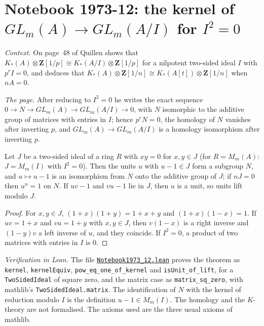 \section[Notebook 1973-12: the kernel of $GL_m(A) \to GL_m(A/I)$ for $I^2 = 0$]{Notebook 1973-12: the kernel of $GL_m(A) \to GL_m(A/I)$ for $I^2 = 0$\protect{}}\label{sec:quillen-1973-12}

\emph{Context.} On page~48 of  Quillen shows that $K_*(A) \otimes \mathbf Z[1/p] \cong K_*(A/I) \otimes \mathbf Z[1/p]$ for a nilpotent two-sided ideal $I$ with $p^rI = 0$, and deduces that $K_*(A) \otimes \mathbf Z[1/n] \cong K_*(A[t]) \otimes \mathbf Z[1/n]$ when $nA = 0$.

\emph{The page.} After reducing to $I^2 = 0$ he writes the exact sequence $0 \to N \to GL_m(A) \to GL_m(A/I) \to 0$, with $N$ isomorphic to the additive group of matrices with entries in $I$; hence $p^rN = 0$, the homology of $N$ vanishes after inverting $p$, and $GL_m(A) \to GL_m(A/I)$ is a homology isomorphism after inverting $p$.

\begin{encadre}
\begin{theoreme}\label{thm:quillen-1973-12}
Let $J$ be a two-sided ideal of a ring $R$ with $xy = 0$ for $x, y \in J$ (for $R = M_m(A)$: $J = M_m(I)$ with $I^2 = 0$). Then the units $u$ with $u - 1 \in J$ form a subgroup $N$, and $u \mapsto u - 1$ is an isomorphism from $N$ onto the additive group of $J$; if $nJ = 0$ then $u^n = 1$ on $N$. If $uv - 1$ and $vu - 1$ lie in $J$, then $u$ is a unit, so units lift modulo $J$.
\end{theoreme}
\end{encadre}

\begin{proof}
For $x, y \in J$, $(1 + x)(1 + y) = 1 + x + y$ and $(1 + x)(1 - x) = 1$. If $uv = 1 + x$ and $vu = 1 + y$ with $x, y \in J$, then $v(1 - x)$ is a right inverse and $(1 - y)v$ a left inverse of $u$, and they coincide. If $I^2 = 0$, a product of two matrices with entries in $I$ is $0$.
\end{proof}

\emph{Verification in Lean.} The file \href{\leanblobmain/Notebook1973_12.lean}{\texttt{Notebook1973\_12.\allowbreak{}lean}} proves the theorem as \texttt{kernel}, \texttt{kernelEquiv}, \texttt{pow\_eq\_one\_of\_kernel} and \texttt{isUnit\_of\_lift}, for a \texttt{TwoSidedIdeal} of square zero, and the matrix case as \texttt{matrix\_sq\_zero}, with mathlib's \texttt{TwoSidedIdeal.matrix}. The identification of $N$ with the kernel of reduction modulo $I$ is the definition $u - 1 \in M_m(I)$. The homology and the $K$-theory are not formalised. The axioms used are the three usual axioms of mathlib.

